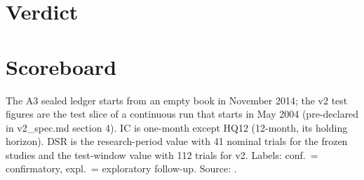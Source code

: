 
\renewcommand{\ReportTitle}{Follow the Workers: Results Book}
\renewcommand{\ReportSubtitle}{Every result, figure, table and claim behind the report, with its source file}
\usepackage{longtable}

\MakeCover
\tableofcontents
\clearpage
\section{Verdict}
\section{Scoreboard}
The A3 sealed ledger starts from an empty book in November 2014; the v2 test figures are the test slice of a continuous run that starts in May 2004 (pre-declared in v2\_spec.md section 4). IC is one-month except HQ12 (12-month, its holding horizon). DSR is the research-period value with 41 nominal trials for the frozen studies and the test-window value with 112 trials for v2. Labels: conf.\ = confirmatory, expl.\ = exploratory follow-up. Source: .
{\scriptsize}
